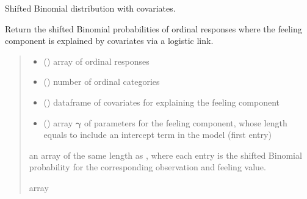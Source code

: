 \documentclass[letterpaper,10pt,english]{sphinxmanual}
\begin{document}
\begin{fulllineitems}
\label{\detokenize{cubmods:cubmods.general.bitgamma}}
\pysigstartsignatures
{}
\pysigstopsignatures
\sphinxAtStartPar
Shifted Binomial distribution with covariates.

\sphinxAtStartPar
Return the shifted Binomial probabilities of ordinal responses where the feeling component 
is explained by covariates via a logistic link.
\begin{quote}\begin{description}
\begin{itemize}
\item {} 
\sphinxAtStartPar
{} () \textendash{} array of ordinal responses

\item {} 
\sphinxAtStartPar
{} () \textendash{} number of ordinal categories

\item {} 
\sphinxAtStartPar
{} () \textendash{} dataframe of covariates for explaining the feeling component

\item {} 
\sphinxAtStartPar
{} () \textendash{} array \(\pmb \gamma\) of parameters for the feeling component, whose length equals 
 to include an intercept term in the model (first entry)

\end{itemize}

\sphinxAtStartPar
an array of the same length as , where each entry is the shifted Binomial probability for
the corresponding observation and feeling value.

\sphinxAtStartPar
array

\end{description}\end{quote}

\end{fulllineitems}
\end{document}
